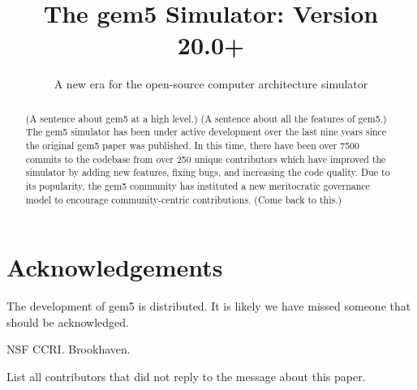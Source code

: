 \documentclass[manuscript, review, screen, timestamp]{acmart}
\begin{document}
\title{The gem5 Simulator: Version 20.0+}
\subtitle{A new era for the open-source computer architecture simulator}



\begin{abstract}
    (A sentence about gem5 at a high level.)
    (A sentence about all the features of gem5.)
    The gem5 simulator has been under active development over the last nine years since the original gem5 paper was published.
    In this time, there have been over 7500 commits to the codebase from over 250 unique contributors which have improved the simulator by adding new features, fixing bugs, and increasing the code quality.
    Due to its popularity, the gem5 community has instituted a new meritocratic governance model to encourage community-centric contributions.
    (Come back to this.)
\end{abstract}

\maketitle
\renewcommand{\shortauthors}{Lowe-Power and the gem5 Community}





\section{Acknowledgements}

The development of gem5 is distributed.
It is likely we have missed someone that should be acknowledged.

NSF CCRI. Brookhaven.

List all contributors that did not reply to the message about this paper.



\end{document}
